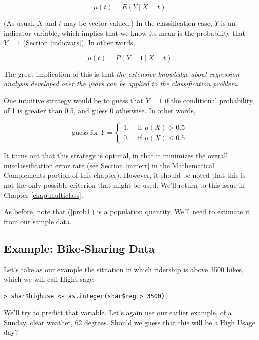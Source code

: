 \begin{equation}
\mu(t) = E(Y ~|~ X = t)
\end{equation}

(As usual, $X$ and $t$ may be vector-valued.)  In the classification
case, $Y$ is an indicator variable, which implies that we know its mean
is the probability that $Y = 1$ (Section \ref{indicvars}).  In other
words,

\begin{equation}
\label{prob1}
\mu(t) = P(Y = 1 ~|~ X = t)
\end{equation}

The great implication of this is that {\it the extensive knowledge about
regression analysis developed over the years can be applied to the
classification problem}.

One intuitive strategy would be to guess that $Y = 1$ if the conditional
probability of 1 is greater than 0.5, and guess 0 otherwise.  In other
words,

\begin{equation}
\textrm{guess for }Y = 
\begin{cases}
      1, & \textrm{ if } \mu(X) > 0.5 \\
      0, & \textrm{ if } \mu(X) \leq 0.5 
\end{cases}
\end{equation}

It turns out that this strategy is optimal, in that it minimizes the
overall misclassification error rate (see Section \ref{minerr} in the
Mathematical Complements portion of this chapter).  However, it should
be noted that this is not the only possible criterion that might be
used. We'll return to this issue in Chapter \ref{chap:multiclass}.

As before, note that (\ref{prob1}) is a population quantity.  We'll need
to estimate it from our sample data.

\subsection{Example:  Bike-Sharing Data}
\label{bikesharedata}

Let's take as our example the situation in
which ridership is above 3500 bikes, which we will call HighUsage:

\begin{lstlisting}
> shar$highuse <- as.integer(shar$reg > 3500)
\end{lstlisting}

We'll try to predict that variable.  Let's again use our earlier
example, of a Sunday, clear weather, 62 degrees.  Should we guess that
this will be a High Usage day?

